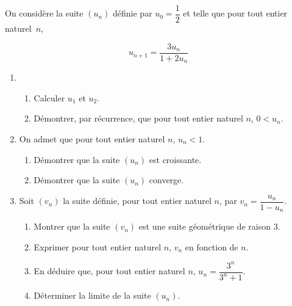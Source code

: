 On considère la suite $(u_n)$ définie par $u_0=\dfrac{1}{2}$ et telle que pour tout entier naturel~$n$, 

\[u_{n+1} = \dfrac{3u_n}{1+2u_n}\]

\begin{enumerate}
\item
  	\begin{enumerate}
  		\item Calculer $u_1$ et $u_2$.
  		\item Démontrer, par récurrence, que pour tout entier naturel $n$, $0 < u_n$.
  	\end{enumerate}
\item On admet que pour tout entier naturel $n$, $u_n<1$.
  	\begin{enumerate}
  		\item Démontrer que la suite $\left(u_n\right)$ est croissante.
  		\item Démontrer que la suite $\left(u_n\right)$ converge.
  	\end{enumerate}
\item Soit $\left(v_n\right)$ la suite définie, pour tout entier naturel $n$, par $v_n = \dfrac{u_n}{1 - u_n}$.
  	\begin{enumerate}
  		\item Montrer que la suite $(v_n)$ est une suite géométrique de raison 3.
  		\item Exprimer pour tout entier naturel $n$, $v_n$ en fonction de $n$.
  		\item En déduire que, pour tout entier naturel $n$, $u_n = \dfrac{3^n}{3^n+1}$.
  		\item Déterminer la limite de la suite $(u_n)$.
  	\end{enumerate}
\end{enumerate}
